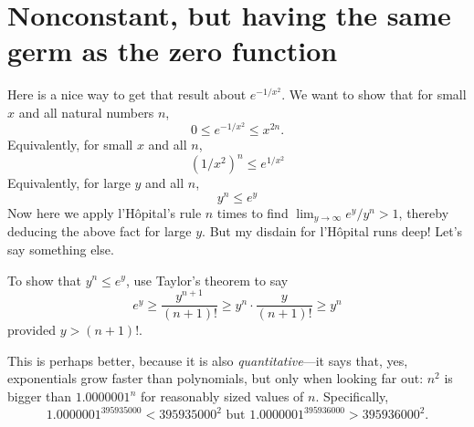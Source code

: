 \documentclass[12pt]{article}
\begin{document}
\section*{Nonconstant, but having the same germ as the zero function}

Here is a nice way to get that result about $e^{-1/x^2}$.  We want to show that for small $x$ and all natural numbers $n$,
$$
0 \leq e^{-1/x^2} \leq x^{2n}.
$$
Equivalently, for small $x$ and all $n$,
$$
(1/x^2)^n \leq e^{1/x^2}
$$
Equivalently, for large $y$ and all $n$,
$$
y^n \leq e^{y}
$$
Now here we apply l'H\^opital's rule $n$ times to find $\lim_{y \to
  \infty} e^y/y^n > 1$, thereby deducing the above fact for large $y$.
But my disdain for l'H\^opital runs deep!  Let's say something else.

To show that $y^n \leq e^y$, use Taylor's theorem to say
$$
e^y \geq \frac{y^{n+1}}{(n+1)!} \geq y^n \cdot \frac{y}{(n+1)!} \geq y^n
$$
provided $y > (n+1)!$.

This is perhaps better, because it is also \textit{quantitative}---it says
that, yes, exponentials grow faster than polynomials, but only when
looking far out: $n^2$ is bigger than $1.0000001^n$ for
reasonably sized values of $n$.  Specifically,
$$
1.0000001^{395935000} < 395935000^2 \mbox{ but } 
1.0000001^{395936000} > 395936000^2.
$$
\end{document}
